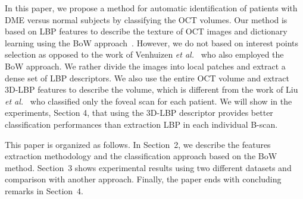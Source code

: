 In this paper, we propose a method for automatic identification of patients with DME versus normal subjects by classifying the OCT volumes. Our method is based on LBP features to describe the texture of OCT images and dictionary learning using the BoW approach~\cite{Sivic2003}.
However, we do not based on interest points selection as opposed to the work of 
Venhuizen \textit{et al.}~\cite{Venhuizen2015} who also employed the BoW approach. We rather divide the images into local patches and extract a dense set of LBP descriptors.
We also use the entire OCT volume and extract 3D-LBP features to describe the volume, which is different from the work of Liu \textit{et al.}~\cite{Liu2011} who classified only the foveal scan for each patient.
We will show in the experiments, Section 4, that using the 3D-LBP descriptor provides better classification performances than extraction LBP in each individual B-scan.

This paper is organized as follows. In Section~2, we describe the features extraction methodology and the classification approach based on the BoW method.
Section~3 shows experimental results using two different datasets and comparison with another approach. Finally, the paper ends with concluding remarks in Section~4.


